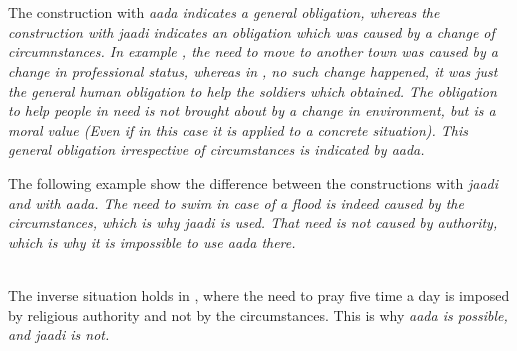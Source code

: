  \\
 \\

The construction with \em aada \em indicates a general obligation, whereas the construction with \em jaadi \em indicates an obligation which was caused by a change of circumnstances. In example , the need to move to another town was caused by a change in professional status, whereas in , no such change happened, it was just the general human obligation to help the soldiers which obtained. The obligation to help people in need is not brought about by a change in environment, but is a moral value (Even if in this case it is applied to a concrete situation). This general obligation irrespective of circumstances is indicated by \em aada\em.

The following  example show the difference between the constructions with \em jaadi \em and with \em aada\em. The need to swim in case of a flood is indeed caused by the circumstances, which is why \em jaadi \em is used. That need is not caused by authority, which is why it is impossible to use \em aada \em there.

 \\
The inverse situation holds in , where the need to pray five time a day is imposed by religious authority and not by the circumstances. This is why \em aada \em is possible, and \em jaadi \em is not.


